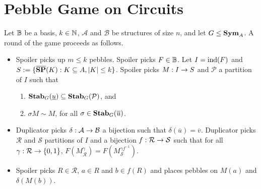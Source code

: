 \documentclass[../main/thesis.tex]{subfiles}
\begin{document}
\section{Pebble Game on Circuits}

\begin{definition}[Game]
  Let $\mathbb{B}$ be a basis, $k \in \mathbb{N}$, $\mathcal{A}$ and $\mathcal{B}$ be
  structures of size $n$, and let $G \leq \text{\textbf{Sym}}_A$. A round of the game proceeds
  as follows.

  \begin{itemize}
    
  \item Spoiler picks up $m \leq k$ pebbles. Spoiler picks $F \in \mathbb{B}$. Let $I =
    \text{\upshape ind}(F)$ and $S := \{\overline{\text{\textbf{SP}}}(K) : K \subseteq A, \vert K \vert \leq
    k\}$. Spoiler picks $M : I \rightarrow S$ and $\mathcal{P}$ a partition of $I$ such
    that
    \begin{enumerate}
    \item $\text{\textbf{Stab}}_G(\underline{u}) \subseteq \text{\textbf{Stab}}_G(\mathcal{P})$, and
    \item $\sigma M \sim M$, for all $\sigma \in \text{\textbf{Stab}}_G(\overline{u})$.
    \end{enumerate}

  \item Duplicator picks $\delta : \mathcal{A} \rightarrow \mathcal{B}$ a bijection such
    that $\delta (\overline{u}) = \overline{v}$. Duplicator picks $\mathcal{R}$
    and $\mathcal{S}$ partitions of $I$ and a bijection $f : \mathcal{R} \rightarrow
    \mathcal{S}$ such that for all $\gamma : \mathcal{R} \rightarrow \{0,1\}$,
    $F(M^{\gamma}_{\mathcal{R}}) = F(M^{\gamma f^{-1}}_{\mathcal{S}})$.

  \item Spoiler picks $R \in \mathcal{R}$, $a \in R$ and $b \in f(R)$ and places
    pebbles on $M(a)$ and $\delta (M(b))$.
    
  \end{itemize}
    
\end{definition}
\end{document}
